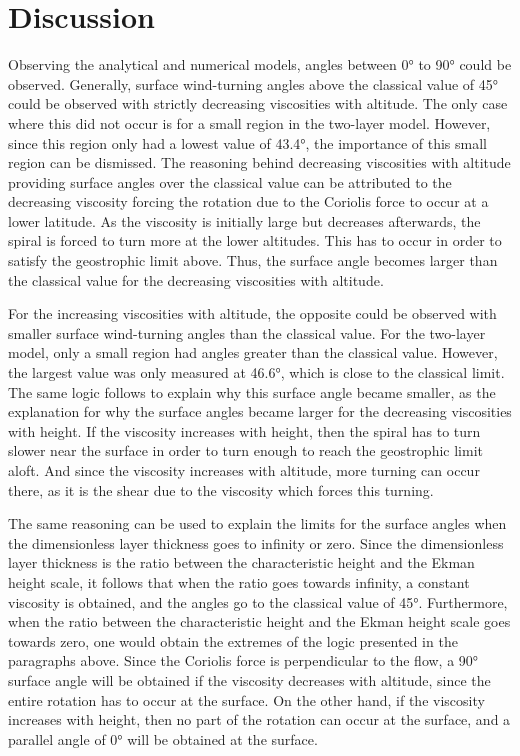 \section{Discussion}
Observing the analytical and numerical models, angles between \ang{0} to \ang{90} could be observed. Generally, surface wind-turning angles above the classical value of \ang{45} could be observed with strictly decreasing viscosities with altitude. The only case where this did not occur is for a small region in the two-layer model. However, since this region only had a lowest value of \ang{43.4}, the importance of this small region can be dismissed. The reasoning behind decreasing viscosities with altitude providing surface angles over the classical value can be attributed to the decreasing viscosity forcing the rotation due to the Coriolis force to occur at a lower latitude. As the viscosity is initially large but decreases afterwards, the spiral is forced to turn more at the lower altitudes. This has to occur in order to satisfy the geostrophic limit above. Thus, the surface angle becomes larger than the classical value for the decreasing viscosities with altitude.

For the increasing viscosities with altitude, the opposite could be observed with smaller surface wind-turning angles than the classical value. For the two-layer model, only a small region had angles greater than the classical value. However, the largest value was only measured at \ang{46.6}, which is close to the classical limit. The same logic follows to explain why this surface angle became smaller, as the explanation for why the surface angles became larger for the decreasing viscosities with height. If the viscosity increases with height, then the spiral has to turn slower near the surface in order to turn enough to reach the geostrophic limit aloft. And since the viscosity increases with altitude, more turning can occur there, as it is the shear due to the viscosity which forces this turning. 

The same reasoning can be used to explain the limits for the surface angles when the dimensionless layer thickness goes to infinity or zero. Since the dimensionless layer thickness is the ratio between the characteristic height and the Ekman height scale, it follows that when the ratio goes towards infinity, a constant viscosity is obtained, and the angles go to the classical value of \ang{45}. Furthermore, when the ratio between the characteristic height and the Ekman height scale goes towards zero, one would obtain the extremes of the logic presented in the paragraphs above. Since the Coriolis force is perpendicular to the flow, a \ang{90} surface angle will be obtained if the viscosity decreases with altitude, since the entire rotation has to occur at the surface. On the other hand, if the viscosity increases with height, then no part of the rotation can occur at the surface, and a parallel angle of \ang{0} will be obtained at the surface.

